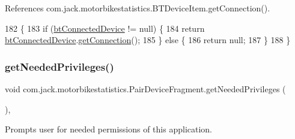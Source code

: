 References com.\+jack.\+motorbikestatistics.\+B\+T\+Device\+Item.\+get\+Connection().


\begin{DoxyCode}
182     \{
183         \textcolor{keywordflow}{if} (\hyperlink{classcom_1_1jack_1_1motorbikestatistics_1_1_pair_device_fragment_afb95960b8365f4696444ea7683ebbf93}{btConnectedDevice} != null) \{
184             \textcolor{keywordflow}{return} \hyperlink{classcom_1_1jack_1_1motorbikestatistics_1_1_pair_device_fragment_afb95960b8365f4696444ea7683ebbf93}{btConnectedDevice}.\hyperlink{classcom_1_1jack_1_1motorbikestatistics_1_1_b_t_device_item_ac3fbff10e5a5b3142ef648bf186b9be0}{getConnection}();
185         \} \textcolor{keywordflow}{else} \{
186             \textcolor{keywordflow}{return} null;
187         \}
188     \}
\end{DoxyCode}
\mbox{\label{classcom_1_1jack_1_1motorbikestatistics_1_1_pair_device_fragment_a5be2be0c93319e38e39cf23943ab1c8c}} 
\subsubsection{\texorpdfstring{get\+Needed\+Privileges()}{getNeededPrivileges()}}
{\footnotesize\ttfamily void com.\+jack.\+motorbikestatistics.\+Pair\+Device\+Fragment.\+get\+Needed\+Privileges (\begin{DoxyParamCaption}{ }\end{DoxyParamCaption})\hspace{0.3cm}{\ttfamily [inline]}, {\ttfamily [private]}}



Prompts user for needed permissions of this application. 

